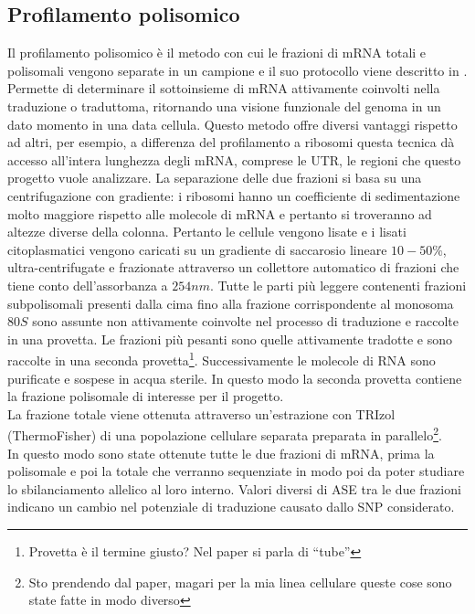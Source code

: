 \subsection{Profilamento polisomico}
Il profilamento polisomico \`e il metodo con cui le frazioni di mRNA totali e polisomali vengono separate in un campione e il suo protocollo viene descritto in \cite{polprofiling}.
Permette di determinare il sottoinsieme di mRNA attivamente coinvolti nella traduzione o traduttoma, ritornando una visione funzionale del genoma in un dato momento in una data cellula.
Questo metodo offre diversi vantaggi rispetto ad altri, per esempio, a differenza del profilamento a ribosomi questa tecnica d\`a accesso all'intera lunghezza degli mRNA, comprese le UTR, le regioni che questo progetto vuole analizzare.
La separazione delle due frazioni si basa su una centrifugazione con gradiente: i ribosomi hanno un coefficiente di sedimentazione molto maggiore rispetto alle molecole di mRNA e pertanto si troveranno ad altezze diverse della colonna.
Pertanto le cellule vengono lisate e i lisati citoplasmatici vengono caricati su un gradiente di saccarosio lineare $10-50\%$, ultra-centrifugate e frazionate attraverso un collettore automatico di frazioni che tiene conto dell'assorbanza a $254nm$.
Tutte le parti pi\`u leggere contenenti frazioni subpolisomali presenti dalla cima fino alla frazione corrispondente al monosoma $80S$ sono assunte non attivamente coinvolte nel processo di traduzione e raccolte in una provetta.
Le frazioni pi\`u pesanti sono quelle attivamente tradotte e sono raccolte in una seconda provetta\footnote{Provetta \`e il termine giusto? Nel paper si parla di ``tube''}.
Successivamente le molecole di RNA sono purificate e sospese in acqua sterile.
In questo modo la seconda provetta contiene la frazione polisomale di interesse per il progetto.\\
La frazione totale viene ottenuta attraverso un'estrazione con TRIzol (ThermoFisher) di una popolazione cellulare separata preparata in parallelo\footnote{Sto prendendo dal paper, magari per la mia linea cellulare queste cose sono state fatte in modo diverso}.\\
In questo modo sono state ottenute tutte le due frazioni di mRNA, prima la polisomale e poi la totale che verranno sequenziate in modo poi da poter studiare lo sbilanciamento allelico al loro interno.
Valori diversi di ASE tra le due frazioni indicano un cambio nel potenziale di traduzione causato dallo SNP considerato.


